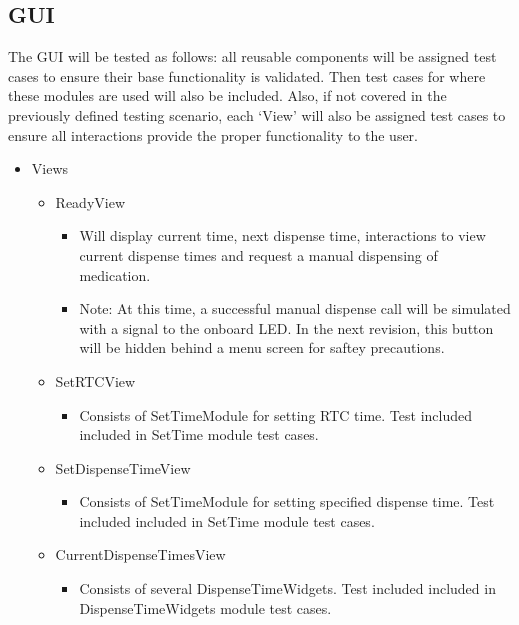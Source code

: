 \documentclass[12pt]{article}
\begin{document}
\subsection{GUI}
    The GUI will be tested as follows: all reusable components will be assigned test cases to ensure their base functionality is validated. Then test cases for where these modules are used will also be included. Also, if not covered in the previously defined testing scenario, each `View' will also be assigned test cases to ensure all interactions provide the proper functionality to the user.
     \begin{itemize}
        \item Views
        \begin{itemize}
            \item ReadyView
            \begin{itemize}
                \item Will display current time, next dispense time, interactions to view current dispense times and request a manual dispensing of medication.
                \item Note: At this time, a successful manual dispense call will be simulated with a signal to the onboard LED. In the next revision, this button will be hidden behind a menu screen for saftey precautions. 
            \end{itemize}
            \item SetRTCView
            \begin{itemize}
                \item Consists of SetTimeModule for setting RTC time. Test included included in SetTime module test cases.
            \end{itemize}
            \item SetDispenseTimeView
            \begin{itemize}
                \item Consists of SetTimeModule for setting specified dispense time. Test included included in SetTime module test cases.
            \end{itemize}
            \item CurrentDispenseTimesView
            \begin{itemize}
                \item Consists of several DispenseTimeWidgets. Test included included in DispenseTimeWidgets module test cases.
            \end{itemize}
        \end{itemize}

\end{itemize}
\end{document}
